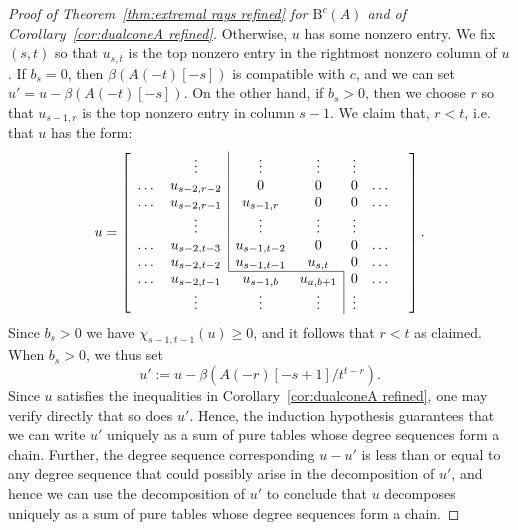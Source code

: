\documentclass[12pt]{amsart}
\theoremstyle{definition}
\theoremstyle{remark}
\newcommand{\cc}{c}
\newcommand{\BBQ}{\mathrm{B}}
\begin{document}
\begin{proof}[Proof of Theorem~\ref{thm:extremal rays refined} for $\BBQ^{\cc}(A)$ and of Corollary~\ref{cor:dualconeA refined}]
Otherwise, $u$ has some nonzero entry.  We fix $(s,t)$ so that $u_{s,t}$ is the top nonzero entry in the rightmost nonzero column of $u$.
If $b_s=0$, then $\beta(A(-t)[-s])$ is compatible with $\cc$, and we can set $u'=u-\beta(A(-t)[-s])$.  On the other hand, if $b_s>0$, then we choose $r$ so that $u_{s-1,r}$ is the top nonzero entry in column $s-1$.  We claim that, $r<t$, i.e. that $u$ has the form:
\[
u=
\left[
\begin{array}{ccccccc}
 & \vdots& \multicolumn{1}{|c}{\vdots}&\vdots& \vdots&&\\
\dots&u_{s-2,r-2}&\multicolumn{1}{|c}{0}&0&0&\dots\\
\dots&u_{s-2,r-1}&\multicolumn{1}{|c}{u_{s-1,r}}&0&0&\dots\\
 & \vdots& \multicolumn{1}{|c}{\vdots}&\vdots& \vdots&&\\
\dots&u_{s-2,t-3}&\multicolumn{1}{|c}{u_{s-1,t-2}}&0&0&\dots\\
\dots&u_{s-2,t-2}&\multicolumn{1}{|c}{u_{s-1,t-1}}&u_{s,t}&0&\dots\\ \cline{3-4}
\dots&u_{s-2,t-1}&u_{s-1,b}&u_{a,b+1}&\multicolumn{1}{|c}{0}&\dots\\
& \vdots&\vdots&\vdots& \multicolumn{1}{|c}{\vdots}&&\\
\end{array}\right].
\]
Since $b_s>0$ we have $\chi_{s-1,t-1}(u)\geq 0$, and it follows that $r<t$ as claimed.  When $b_s>0$, we thus set
\[
u':=u-\beta(A(-r)[-s+1]/t^{t-r}).
\]
Since $u$ satisfies the inequalities in Corollary~\ref{cor:dualconeA refined}, one may verify directly that so does $u'$.  Hence, the induction hypothesis guarantees that we can write $u'$ uniquely as a sum of pure tables whose degree sequences form a chain.  Further, the degree sequence corresponding $u-u'$ is less than or equal to any degree sequence that could possibly arise in the decomposition of $u'$, and hence we can use the decomposition of $u'$ to conclude that $u$ decomposes uniquely as a sum of pure tables whose degree sequences form a chain.


\end{proof}
\end{document}
